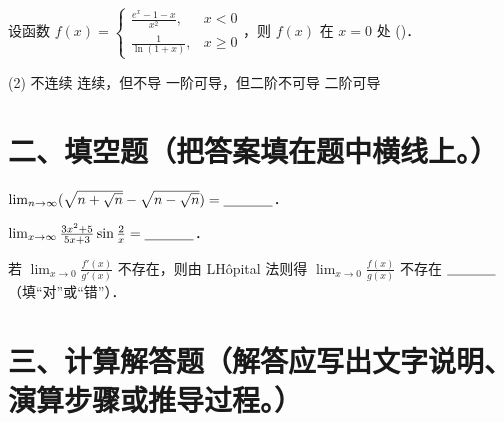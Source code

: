 \documentclass[
  a4paper,
  11pt,
  title in boldface,
  theorem in new line,
  remove problem qed
]{homework}
\begin{document}
\begin{problem}
  设函数 $f(x) = \begin{cases} \frac{e^x-1-x}{x^2}, & x < 0 \\ \frac{1}{\ln(1+x)}, & x \ge 0 \end{cases}$，则 $f(x)$ 在 $x=0$ 处 (\quad)．

  \begin{tasks}(2)
  \task 不连续
  \task 连续，但不导
  \task 一阶可导，但二阶不可导
  \task 二阶可导
\end{tasks}
\end{problem}

\section*{二、填空题（把答案填在题中横线上。）}

\begin{problem}
  $\lim_{n \to \infty} (\sqrt{n+\sqrt{n}} - \sqrt{n-\sqrt{n}}) = \underline{\hspace{3.5em}}$．

  \vspace{1.2cm}
\end{problem}

\begin{problem}
  $\lim_{x \to \infty} \frac{3x^2+5}{5x+3} \sin \frac{2}{x} = \underline{\hspace{3.5em}}$．

  \vspace{1.2cm}
\end{problem}

\begin{problem}
  若 $\lim_{x \to 0} \frac{f'(x)}{g'(x)}$ 不存在，则由 LHôpital 法则得 $\lim_{x \to 0} \frac{f(x)}{g(x)}$ 不存在 $\underline{\hspace{3.5em}}$ （填“对”或“错”）．

  \vspace{1.2cm}
\end{problem}

\section*{三、计算解答题（解答应写出文字说明、演算步骤或推导过程。）}
\end{document}
